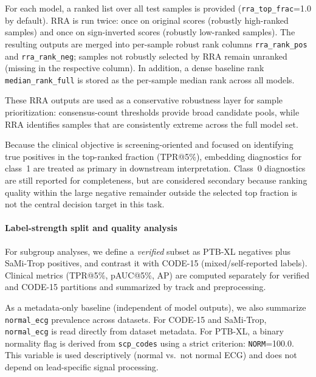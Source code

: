 For each model, a ranked list over all test samples is provided (\texttt{rra\_top\_frac}=1.0 by default).
RRA is run twice: once on original scores (robustly high-ranked samples) and once on sign-inverted scores (robustly low-ranked samples).
The resulting outputs are merged into per-sample robust rank columns \texttt{rra\_rank\_pos} and \texttt{rra\_rank\_neg}; samples not robustly selected by RRA remain unranked (missing in the respective column).
In addition, a dense baseline rank \texttt{median\_rank\_full} is stored as the per-sample median rank across all models.

These RRA outputs are used as a conservative robustness layer for sample prioritization: consensus-count thresholds provide broad candidate pools, while RRA identifies samples that are consistently extreme across the full model set.

Because the clinical objective is screening-oriented and focused on identifying true positives in the top-ranked fraction (TPR@5\%), embedding diagnostics for class~1 are treated as primary in downstream interpretation.
Class~0 diagnostics are still reported for completeness, but are considered secondary because ranking quality within the large negative remainder outside the selected top fraction is not the central decision target in this task.

\paragraph*{Label-strength split and quality analysis}
For subgroup analyses, we define a \emph{verified} subset as PTB-XL negatives plus SaMi-Trop positives, and contrast it with CODE-15 (mixed/self-reported labels).
Clinical metrics (TPR@5\%, pAUC@5\%, AP) are computed separately for verified and CODE-15 partitions and summarized by track and preprocessing.

As a metadata-only baseline (independent of model outputs), we also summarize \texttt{normal\_ecg} prevalence across datasets.
For CODE-15 and SaMi-Trop, \texttt{normal\_ecg} is read directly from dataset metadata.
For PTB-XL, a binary normality flag is derived from \texttt{scp\_codes} using a strict criterion: \texttt{NORM}=100.0.
This variable is used descriptively (normal vs.\ not normal ECG) and does not depend on lead-specific signal processing.

